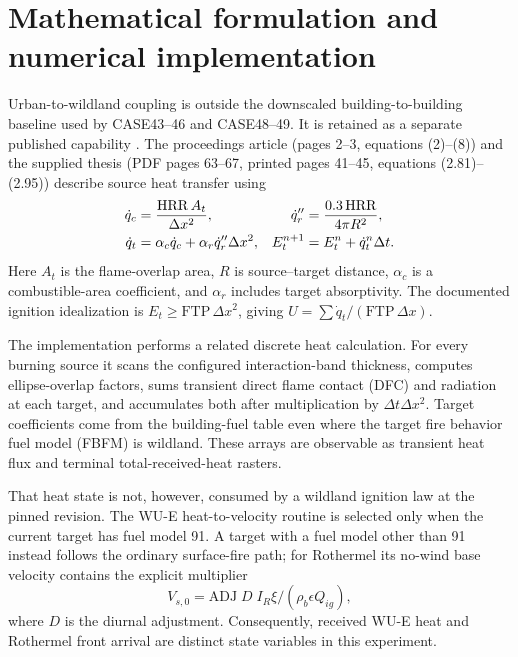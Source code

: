 \section{Mathematical formulation and numerical implementation}
Urban-to-wildland coupling is outside the downscaled
building-to-building baseline used by CASE43--46 and CASE48--49. It is retained
as a separate published capability \cite{PurnomoPCI2024,PurnomoIJWF2024}.
The proceedings article (pages 2--3,
equations (2)--(8)) and the
supplied thesis (PDF pages 63--67, printed pages 41--45, equations
(2.81)--(2.95)) describe source heat transfer using
\begin{align}
 \dot q_c &= \frac{\mathrm{HRR}\,A_t}{\Delta x^2}, &
 \dot q_r'' &= \frac{0.3\,\mathrm{HRR}}{4\pi R^2}, \\
 \dot q_t &= \alpha_c\dot q_c+\alpha_r\dot q_r''\Delta x^2, &
 E_t^{n+1} &= E_t^n+\dot q_t^n\Delta t .
\end{align}
Here $A_t$ is the flame-overlap area, $R$ is source--target distance,
$\alpha_c$ is a combustible-area coefficient, and $\alpha_r$ includes target
absorptivity.  The documented ignition idealization is
$E_t\geq\mathrm{FTP}\,\Delta x^2$, giving
$U=\sum\dot q_t/(\mathrm{FTP}\,\Delta x)$.

The implementation performs a related discrete heat calculation.  For every
burning source it scans the configured interaction-band thickness, computes
ellipse-overlap factors, sums transient direct flame contact (DFC) and radiation at each target,
and accumulates both after multiplication by $\Delta t\Delta x^2$.  Target
coefficients come from the building-fuel table even where the target fire behavior fuel model (FBFM)
is wildland.  These arrays are observable as transient heat flux and terminal
total-received-heat rasters.

That heat state is not, however, consumed by a wildland ignition law at the
pinned revision.  The WU-E heat-to-velocity routine is selected only when the
current target has fuel model 91.  A target with a fuel model other than 91
instead follows the ordinary surface-fire path; for Rothermel its no-wind base
velocity contains the explicit multiplier
\begin{equation}
 V_{s,0}=\mathrm{ADJ}\;D\;I_R\xi/(\rho_b\epsilon Q_{ig}),
\end{equation}
where $D$ is the diurnal adjustment.  Consequently, received WU-E heat and
Rothermel front arrival are distinct state variables in this experiment.

